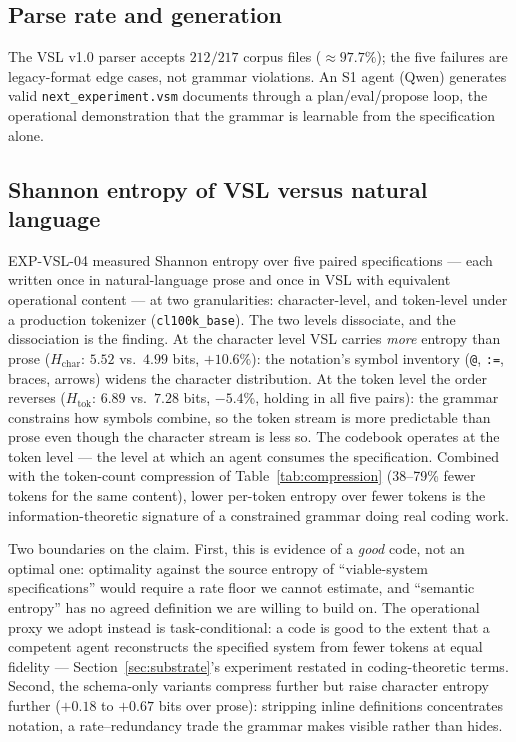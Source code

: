 \documentclass[12pt]{article}
\begin{document}
\subsection{Parse rate and generation}
\label{sec:parse}

The VSL v1.0 parser accepts $212/217$ corpus files ($\approx 97.7\%$); the five failures
are legacy-format edge cases, not grammar violations. An S1 agent (Qwen) generates valid
\texttt{next\_experiment.vsm} documents through a plan/eval/propose loop, the operational
demonstration that the grammar is learnable from the specification alone.

\subsection{Shannon entropy of VSL versus natural language}
\label{sec:entropy}


EXP-VSL-04 measured Shannon entropy over five paired specifications ---
each written once in natural-language prose and once in VSL with equivalent
operational content --- at two granularities: character-level, and
token-level under a production tokenizer (\texttt{cl100k\_base}).
The two levels dissociate, and the dissociation is the finding.
At the character level VSL carries \emph{more} entropy than prose
($H_\text{char}$: $5.52$ vs.\ $4.99$ bits, $+10.6\%$): the notation's symbol
inventory (\texttt{@}, \texttt{:=}, braces, arrows) widens the character
distribution. At the token level the order reverses
($H_\text{tok}$: $6.89$ vs.\ $7.28$ bits, $-5.4\%$, holding in all five
pairs): the grammar constrains how symbols combine, so the token stream is
more predictable than prose even though the character stream is less so.
The codebook operates at the token level --- the level at which an agent
consumes the specification. Combined with the token-count compression of
Table~\ref{tab:compression} (38--79\% fewer tokens for the same content),
lower per-token entropy over fewer tokens is the information-theoretic
signature of a constrained grammar doing real coding work.

Two boundaries on the claim. First, this is evidence of a \emph{good} code,
not an optimal one: optimality against the source entropy of ``viable-system
specifications'' would require a rate floor we cannot estimate, and
``semantic entropy'' has no agreed definition we are willing to build on.
The operational proxy we adopt instead is task-conditional: a code is good
to the extent that a competent agent reconstructs the specified system from
fewer tokens at equal fidelity --- Section~\ref{sec:substrate}'s experiment
restated in coding-theoretic terms. Second, the schema-only variants
compress further but raise character entropy further ($+0.18$ to $+0.67$
bits over prose): stripping inline definitions concentrates notation, a
rate--redundancy trade the grammar makes visible rather than hides.
\end{document}

